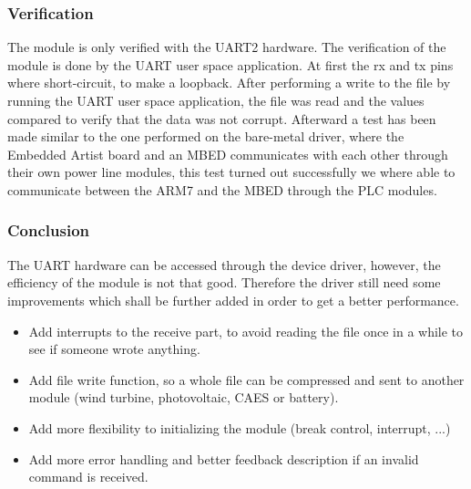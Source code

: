 \subsubsection{Verification}
The module is only verified with the UART2 hardware. The verification of the module is done by the UART user space application. At first the rx and tx pins where short-circuit, to make a loopback. After performing a write to the file by running the UART user space application, the file was read and the values compared to verify that the data was not corrupt. Afterward a test has been made similar to the one performed on the bare-metal driver, where the Embedded Artist board and an MBED communicates with each other through their own power line modules, this test turned out successfully we where able to communicate between the ARM7 and the MBED through the PLC modules.
%
\subsubsection{Conclusion}
\label{sec:device_driver_conclusion}
The UART hardware can be accessed through the device driver, however, the efficiency of the module is not that good. Therefore the driver still need some improvements which shall be further added in order to get a better performance. 
\begin{itemize}
	\item Add interrupts to the receive part, to avoid reading the file once in a while to see if someone wrote anything.
	\item Add file write function, so a whole file can be compressed and sent to another module (wind turbine, photovoltaic, CAES or battery).
	\item Add more flexibility to initializing the module (break control, interrupt, ...) 
	\item Add more error handling and better feedback description if an invalid command is received.
\end{itemize}

